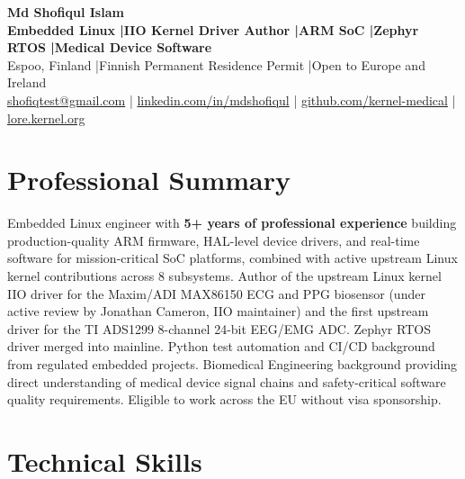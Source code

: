 \documentclass[10.5pt,a4paper]{article}
\begin{document}
\noindent{\color{accent}\rule{\linewidth}{2.5pt}}
\begin{center}
  \vspace{6pt}
  {\Huge\bfseries Md Shofiqul Islam}\\[7pt]
  {\normalsize\bfseries Embedded Linux \enspace|\enspace IIO Kernel Driver Author \enspace|\enspace ARM SoC \enspace|\enspace Zephyr RTOS \enspace|\enspace Medical Device Software}\\[6pt]
  {\small Espoo, Finland \enspace|\enspace Finnish Permanent Residence Permit \enspace|\enspace Open to Europe and Ireland}\\[4pt]
  {\small
    \href{mailto:shofiqtest@gmail.com}{shofiqtest@gmail.com} \enspace|\enspace
    \href{https://www.linkedin.com/in/mdshofiqul/}{linkedin.com/in/mdshofiqul} \enspace|\enspace
    \href{https://github.com/kernel-medical}{github.com/kernel-medical} \enspace|\enspace
    \href{https://lore.kernel.org/all/?q=Md+Shofiqul+Islam}{lore.kernel.org}}
  \vspace{6pt}
\end{center}
\noindent{\color{accent}\rule{\linewidth}{1pt}}
\vspace{4pt}

\section{Professional Summary}

Embedded Linux engineer with \textbf{5+ years of professional experience} building production-quality ARM firmware, HAL-level device drivers, and real-time software for mission-critical SoC platforms, combined with active upstream Linux kernel contributions across 8 subsystems. Author of the upstream Linux kernel IIO driver for the Maxim/ADI MAX86150 ECG and PPG biosensor (under active review by Jonathan Cameron, IIO maintainer) and the first upstream driver for the TI ADS1299 8-channel 24-bit EEG/EMG ADC. Zephyr RTOS driver merged into mainline. Python test automation and CI/CD background from regulated embedded projects. Biomedical Engineering background providing direct understanding of medical device signal chains and safety-critical software quality requirements. Eligible to work across the EU without visa sponsorship.

\section{Technical Skills}
\end{document}
